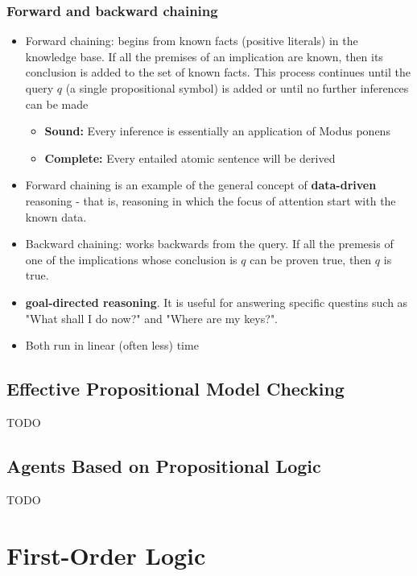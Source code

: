 \documentclass{scrartcl}
\begin{document}
\subsubsection{Forward and backward chaining}
\begin{itemize}
    \item
        Forward chaining: begins from known facts (positive literals) in the knowledge base. If all the premises of an implication are known, then its conclusion is added to the set of known facts. This process continues until the query $q$ (a single propositional symbol) is added or until no further inferences can be made
    \begin{itemize}
        \item
            \textbf{Sound:} Every inference is essentially an application of Modus ponens
        \item
            \textbf{Complete:} Every entailed atomic sentence will be derived
    \end{itemize}
    
    \item
        Forward chaining is an example of the general concept of \textbf{data-driven} reasoning - that is, reasoning in which the focus of attention start with the known data.
    \item
        Backward chaining: works backwards from the query. If all the premesis of one of the implications whose conclusion is $q$ can be proven true, then $q$ is true.
    \item
        \textbf{goal-directed reasoning}. It is useful for answering specific questins such as "What shall I do now?" and "Where are my keys?".
    \item
        Both run in linear (often less) time
\end{itemize}

\subsection{Effective Propositional Model Checking}
    TODO

\subsection{Agents Based on Propositional Logic}
    TODO

\newpage

\section{First-Order Logic}
\end{document}
